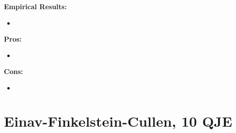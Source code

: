 \documentclass{book}
\theoremstyle{plain}
\theoremstyle{definition}
\begin{document}
\vspace{1em}
\noindent
\textbf{Empirical Results:}
\begin{itemize}
	\item 
\end{itemize}

\vspace{1em}
\noindent
\textbf{Pros:}
\begin{itemize}
	\item 
\end{itemize}

\vspace{1em}
\noindent
\textbf{Cons:}
\begin{itemize}
	\item 
\end{itemize}



\section{Einav-Finkelstein-Cullen, 10 QJE} %
\label{sec:einav_finkelstein_cullen_10_qje}

\textbf{}
\end{document}
